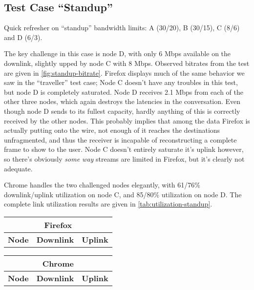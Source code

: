 \subsection{Test Case ``Standup''}

Quick refresher on ``standup'' bandwidth limits: A (30/20), B (30/15), C (8/6) and D (6/3).

The key challenge in this case is node D, with only 6 Mbps available on the downlink, slightly upped by node C with 8 Mbps. Observed bitrates from the test are given in \autoref{fig:standup-bitrate}. Firefox displays much of the same behavior we saw in the ``traveller'' test case; Node C doesn't have any troubles in this test, but node D is completely saturated. Node D receives 2.1 Mbps from each of the other three nodes, which again destroys the latencies in the conversation. Even though node D sends to its fullest capacity, hardly anything of this is correctly received by the other nodes. This probably implies that among the data Firefox is actually putting onto the wire, not enough of it reaches the destinations unfragmented, and thus the receiver is incapable of reconstructing a complete frame to show to the user. Node C doesn't entirely saturate it's uplink however, so there's obviously \emph{some way} streams are limited in Firefox, but it's clearly not adequate.

Chrome handles the two challenged nodes elegantly, with 61/76\% downlink/uplink utilization on node C, and 85/80\% utilization on node D. The complete link utilization results are given in \autoref{tab:utilization-standup}.

\begin{center}
    \label{tab:utilization-standup}
    \begin{tabular}{| l | l | l |}
    \multicolumn{3}{c}{\textbf{Firefox}} \\ \hline
    \textbf{Node} & \textbf{Downlink} & \textbf{Uplink} \\ \hline
    
    \hline
    \end{tabular}
    \begin{tabular}{| l | l | l |}
    \multicolumn{3}{c}{\textbf{Chrome}} \\ \hline
    \textbf{Node} & \textbf{Downlink} & \textbf{Uplink} \\ \hline
    
    \hline
    \end{tabular}
\end{center}

